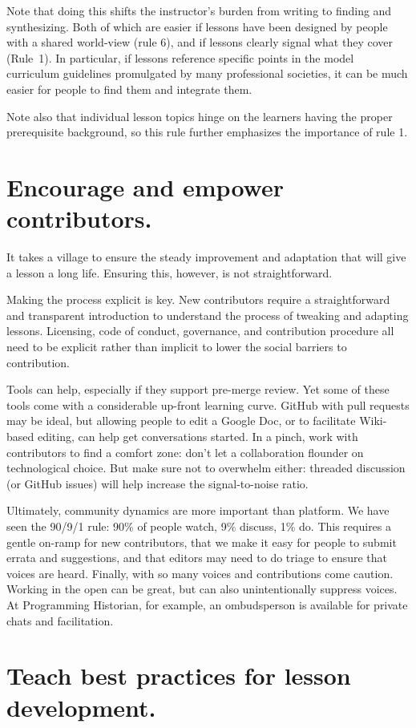 \documentclass[10pt,letterpaper]{article}
\newcommand{\rulemajor}[1]{\section{#1}}
\begin{document}
Note that doing this shifts the instructor's burden from writing to finding and synthesizing.
Both of which are easier if lessons have been designed by people with a shared world-view (rule 6),
and if lessons clearly signal what they cover (Rule~1).
In particular,
if lessons reference specific points in the model curriculum guidelines promulgated by many professional societies,
it can be much easier for people to find them and integrate them.

Note also that individual lesson topics hinge on the learners having the proper prerequisite background,
so this rule further emphasizes the importance of rule 1.

\rulemajor{Encourage and empower contributors.}

It takes a village to ensure
the steady improvement and adaptation that will give a lesson a long life.
Ensuring this, however, is not straightforward.

Making the process explicit is key.
New contributors require a straightforward and transparent introduction
to understand the process of tweaking and adapting lessons.
Licensing, code of conduct, governance, and contribution procedure
all need to be explicit rather than implicit
to lower the social barriers to contribution.

Tools can help,
especially if they support pre-merge review.
Yet some of these tools come with a considerable up-front learning curve.
GitHub with pull requests may be ideal,
but allowing people to edit a Google Doc,
or to facilitate Wiki-based editing,
can help get conversations started.
In a pinch,
work with contributors to find a comfort zone:
don't let a collaboration flounder on technological choice.
But make sure not to overwhelm either:
threaded discussion (or GitHub issues) will help increase the signal-to-noise ratio.

Ultimately,
community dynamics are more important than platform.
We have seen the 90/9/1 rule:
90\% of people watch, 9\% discuss, 1\% do.
This requires a gentle on-ramp for new contributors,
that we make it easy for people to submit errata and suggestions,
and that editors may need to do triage to ensure that voices are heard.
Finally, with so many voices and contributions come caution.
Working in the open can be great,
but can also unintentionally suppress voices.
At Programming Historian,
for example,
an ombudsperson is available for private chats and facilitation.

\rulemajor{Teach best practices for lesson development.}
\end{document}
